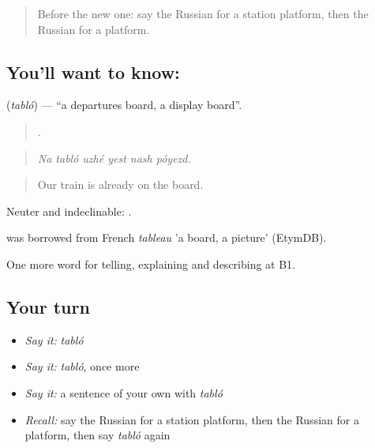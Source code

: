 \label{lesson:RU-C414-tablo}



\begin{quote}
Before the new one: say the Russian for a station platform, then the Russian for a platform.
\end{quote}

\subsection*{You'll want to know: }
\textbf{} (\emph{tabló}) — \textquotedblleft{}a departures board, a display board\textquotedblright{}.

\begin{quote}
     .
\end{quote}

\begin{quote}
\emph{Na tabló uzhé yest nash póyezd.}
\end{quote}

\begin{quote}
Our train is already on the board.
\end{quote}

Neuter and indeclinable: \emph{ }.

\begin{cousinweb}
\emph{} was borrowed from French \emph{tableau} 'a board, a picture' (EtymDB).
\end{cousinweb}

\begin{grammarlens}[title={What you've built}]
One more word for telling, explaining and describing at B1.
\end{grammarlens}

\subsection*{Your turn}
\begin{itemize}
\raggedright
  \item \emph{Say it:} \emph{tabló}
  \item \emph{Say it:} \emph{tabló}, once more
  \item \emph{Say it:} a sentence of your own with \emph{tabló}
  \item \emph{Recall:} say the Russian for a station platform, then the Russian for a platform, then say \emph{tabló} again
\end{itemize}

